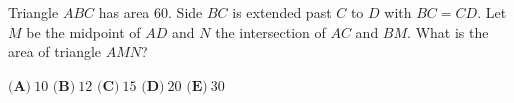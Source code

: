 Triangle $ABC$ has area $60$. Side $BC$ is extended past $C$ to $D$ with $BC=CD$. Let $M$ be the midpoint of $AD$ and $N$ the intersection of $AC$ and $BM$. What is the area of triangle $AMN$?

$\textbf{(A)}\ 10$ \qquad $\textbf{(B)}\ 12$ \qquad $\textbf{(C)}\ 15$ \qquad $\textbf{(D)}\ 20$ \qquad $\textbf{(E)}\ 30$

